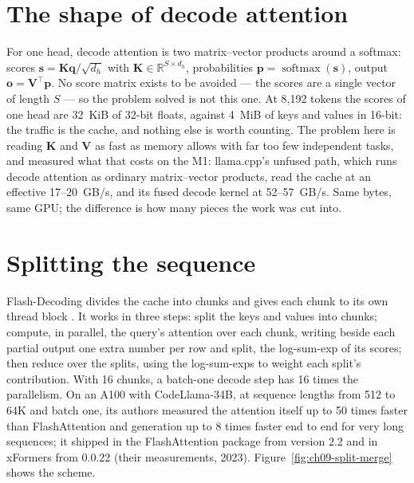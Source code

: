 \section{The shape of decode attention}

For one head, decode attention is two matrix--vector products around a softmax:
scores $\mathbf{s}=\mathbf{K}\mathbf{q}/\sqrt{d_h}$ with
$\mathbf{K}\in\mathbb{R}^{S\times d_h}$, probabilities
$\mathbf{p}=\operatorname{softmax}(\mathbf{s})$, output
$\mathbf{o}=\mathbf{V}^{\top}\mathbf{p}$. No score matrix exists to be
avoided --- the scores are a single vector of length $S$ --- so the problem
 solved is not this one. At 8,192 tokens the scores of
one head are 32~KiB of 32-bit floats, against 4~MiB of keys and values in
16-bit: the traffic is the cache, and nothing else is worth counting. The
problem here is reading $\mathbf{K}$ and $\mathbf{V}$ as fast as memory allows
with far too few independent tasks, and  measured what
that costs on the M1: llama.cpp's unfused path, which runs decode attention as
ordinary matrix--vector products, read the cache at an effective 17--20~GB/s,
and its fused decode kernel at 52--57~GB/s. Same bytes, same GPU; the
difference is how many pieces the work was cut into.

\section{Splitting the sequence}

Flash-Decoding divides the cache into chunks and gives each chunk to its own
thread block \cite{dao2023flashdecoding}. It works in three steps: split the
keys and values into chunks; compute, in parallel, the query's attention over
each chunk, writing beside each partial output one extra number per row and
split, the log-sum-exp of its scores; then reduce over the splits, using the
log-sum-exps to weight each split's contribution. With 16 chunks, a batch-one
decode step has 16 times the parallelism. On an A100 with CodeLlama-34B, at
sequence lengths from 512 to 64K and batch one, its authors measured the
attention itself up to 50 times faster than FlashAttention and generation up to
8 times faster end to end for very long sequences; it shipped in the
FlashAttention package from version 2.2 and in xFormers from 0.0.22 (their
measurements, 2023). Figure~\ref{fig:ch09-split-merge} shows the scheme.


